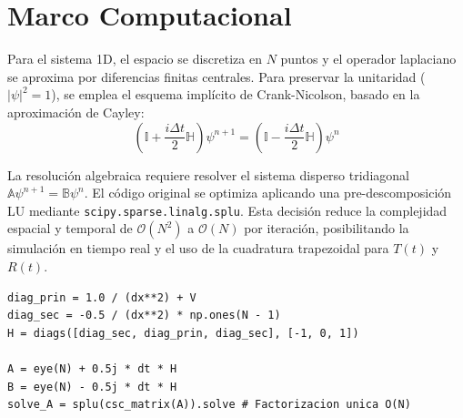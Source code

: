 \section{Marco Computacional}

Para el sistema 1D, el espacio se discretiza en $N$ puntos y el operador laplaciano se aproxima por diferencias finitas centrales. Para preservar la unitaridad ($|\psi |^2=1$), se emplea el esquema implícito de Crank-Nicolson, basado en la aproximación de Cayley:
\begin{equation}
    \left( \mathbb{I} + \frac{i \Delta t}{2} \mathbb{H} \right) \psi^{n+1} = \left( \mathbb{I} - \frac{i \Delta t}{2} \mathbb{H} \right) \psi^n
\end{equation}

La resolución algebraica requiere resolver el sistema disperso tridiagonal $\mathbb{A} \psi^{n+1} = \mathbb{B} \psi^n$. El código original se optimiza aplicando una pre-descomposición LU mediante \texttt{scipy.sparse.linalg.splu}. Esta decisión reduce la complejidad espacial y temporal de $\mathcal{O}(N^2)$ a $\mathcal{O}(N)$ por iteración, posibilitando la simulación en tiempo real y el uso de la cuadratura trapezoidal para $T(t)$ y $R(t)$.

\begin{lstlisting}[caption={Integración temporal 1D optimizada con matrices dispersas y descomposición LU.}, label={lst:cn_solver}]
diag_prin = 1.0 / (dx**2) + V
diag_sec = -0.5 / (dx**2) * np.ones(N - 1)
H = diags([diag_sec, diag_prin, diag_sec], [-1, 0, 1])

A = eye(N) + 0.5j * dt * H
B = eye(N) - 0.5j * dt * H
solve_A = splu(csc_matrix(A)).solve # Factorizacion unica O(N)
\end{lstlisting}




